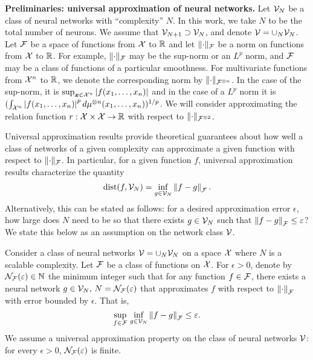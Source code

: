 \textbf{Preliminaries: universal approximation of neural networks.} Let ${\mathcal{V}}_N$ be a class of neural networks with ``complexity'' $N$. In this work, we take $N$ to be the total number of neurons. We assume that ${\mathcal{V}}_{N+1} \supset {\mathcal{V}}_N$, and denote ${\mathcal{V}} = \cup_N{{\mathcal{V}}_N}$. Let ${\mathcal{F}}$ be a space of functions from ${\mathcal{X}}$ to $\mathbb{R}$ and let $\lVert\cdot\rVert_{\mathcal{F}}$ be a norm on functions from ${\mathcal{X}}$ to $\mathbb{R}$. For example, $\lVert\cdot\rVert_{\mathcal{F}}$ may be the sup-norm or an $L^p$ norm, and ${\mathcal{F}}$ may be a class of functions of a particular smoothness. For multivariate functions from ${\mathcal{X}}^n$ to $\mathbb{R}$, we denote the corresponding norm by $\lVert\cdot\rVert_{{\mathcal{F}}^{\otimes n}}$. In the case of the sup-norm, it is $\sup_{\bm{x} \in {\mathcal{X}}^n} \left\lvert f(x_1, \ldots, x_n)\right\rvert$ and in the case of a $L^p$ norm it is $(\int_{{\mathcal{X}}^n} \left\lvert f(x_1, \ldots, x_n)\right\rvert^p d\mu^{\otimes n}(x_1, \ldots, x_n))^{1/p}$. We will consider approximating the relation function $r: {\mathcal{X}} \times {\mathcal{X}} \to \mathbb{R}$ with respect to $\lVert\cdot\rVert_{{\mathcal{F}}^{\otimes 2}}$.

Universal approximation results provide theoretical guarantees about how well a class of networks of a given complexity can approximate a given function with respect to $\lVert\cdot\rVert_{\mathcal{F}}$. In particular, for a given function $f$, universal approximation results characterize the quantity
\[\mathrm{dist}(f, {\mathcal{V}}_N) = \inf_{g \in {\mathcal{V}}_N} \left\lVert f - g\right\rVert_{{\mathcal{F}}}.\]
Alternatively, this can be stated as follows: for a desired approximation error $\epsilon$, how large does $N$ need to be so that there exists $g \in {\mathcal{V}}_N$ such that $\left\lVert f - g\right\rVert_{{\mathcal{F}}} \leq \varepsilon$? We state this below as an assumption on the network class ${\mathcal{V}}$.

\begin{assumption}\label{ass:univ_approx_efficiency}
	Consider a class of neural networks ${\mathcal{V}} = \cup_N {\mathcal{V}}_N$ on a space ${\mathcal{X}}$ where $N$ is a scalable complexity. Let ${\mathcal{F}}$ be a class of functions on ${\mathcal{X}}$. For $\epsilon > 0$, denote by ${\mathcal{N}}_{\mathcal{F}}(\varepsilon) \in \mathbb{N}$ the minimum integer such that for any function $f \in {\mathcal{F}}$, there exists a neural network $g \in {\mathcal{V}}_N, \, N = {\mathcal{N}}_{\mathcal{F}}(\varepsilon)$ that approximates $f$ with respect to $\left\lVert\cdot\right\rVert_{\mathcal{F}}$ with error bounded by $\epsilon$. That is,
	\begin{equation*}
		\sup_{f \in \calF} \, \inf_{g \in \calV_N} \norm{f - g}_{\calF} \leq \epsilon.
	\end{equation*}
	We assume a universal approximation property on the class of neural networks ${\mathcal{V}}$: for every $\epsilon > 0$, ${\mathcal{N}}_{\mathcal{F}}(\varepsilon)$ is finite.
\end{assumption}

